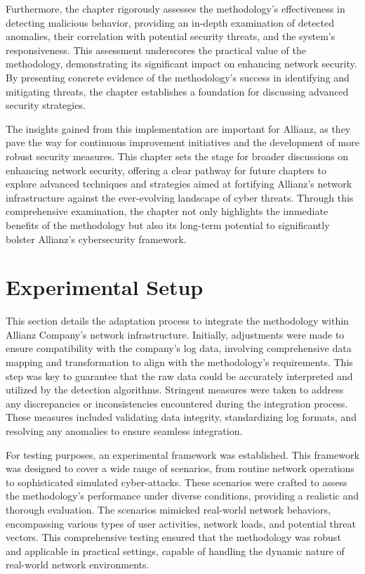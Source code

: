 Furthermore, the chapter rigorously assesses the methodology's effectiveness in detecting malicious behavior, providing an in-depth examination of detected anomalies, their correlation with potential security threats, and the system's responsiveness. This assessment underscores the practical value of the methodology, demonstrating its significant impact on enhancing network security. By presenting concrete evidence of the methodology's success in identifying and mitigating threats, the chapter establishes a foundation for discussing advanced security strategies.

The insights gained from this implementation are important for Allianz, as they pave the way for continuous improvement initiatives and the development of more robust security measures. This chapter sets the stage for broader discussions on enhancing network security, offering a clear pathway for future chapters to explore advanced techniques and strategies aimed at fortifying Allianz's network infrastructure against the ever-evolving landscape of cyber threats. Through this comprehensive examination, the chapter not only highlights the immediate benefits of the methodology but also its long-term potential to significantly bolster Allianz's cybersecurity framework.

\section{Experimental Setup}
This section details the adaptation process to integrate the methodology within Allianz Company’s network infrastructure. Initially, adjustments were made to ensure compatibility with the company’s log data, involving comprehensive data mapping and transformation to align with the methodology's requirements. This step was key to guarantee that the raw data could be accurately interpreted and utilized by the detection algorithms. Stringent measures were taken to address any discrepancies or inconsistencies encountered during the integration process. These measures included validating data integrity, standardizing log formats, and resolving any anomalies to ensure seamless integration.

For testing purposes, an experimental framework was established. This framework was designed to cover a wide range of scenarios, from routine network operations to sophisticated simulated cyber-attacks. These scenarios were crafted to assess the methodology's performance under diverse conditions, providing a realistic and thorough evaluation. The scenarios mimicked real-world network behaviors, encompassing various types of user activities, network loads, and potential threat vectors. This comprehensive testing ensured that the methodology was robust and applicable in practical settings, capable of handling the dynamic nature of real-world network environments.

